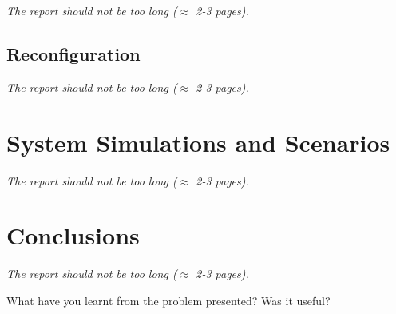 \documentclass[a4paper, 11pt]{article}
\begin{document}
\textit{The report should not be too long ($\approx$
	2-3 pages).}

\subsection{Reconfiguration}
\textit{The report should not be too long ($\approx$
	2-3 pages).}

\section{System Simulations and Scenarios}
\textit{The report should not be too long ($\approx$
	2-3 pages).}


\section{Conclusions}

\textit{The report should not be too long ($\approx$
  2-3 pages).}

What have you learnt from the problem presented?
Was it useful?
\end{document}
